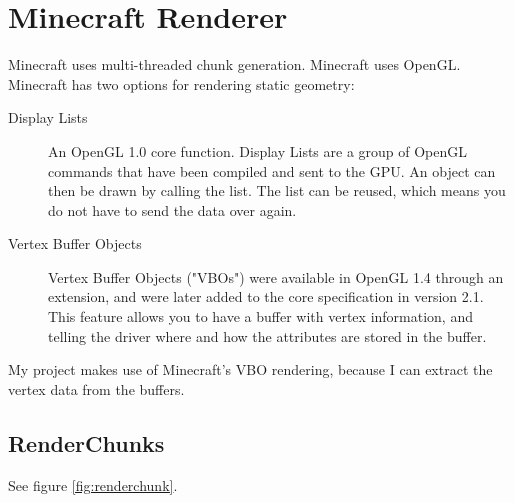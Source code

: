 \documentclass[]{article}
\begin{document}
\section{Minecraft Renderer}
Minecraft uses multi-threaded chunk generation.
Minecraft uses OpenGL.
Minecraft has two options for rendering static geometry:
\begin{description}
  \item[Display Lists] An OpenGL 1.0 core function.
    Display Lists are a group of OpenGL commands that have been compiled and sent to the GPU.
    An object can then be drawn by calling the list.
    The list can be reused, which means you do not have to send the data over again.
  \item[Vertex Buffer Objects] Vertex Buffer Objects ("VBOs") were available in OpenGL 1.4 through an extension, and were later added to the core specification in version 2.1.
    This feature allows you to have a buffer with vertex information, and telling the driver where and how the attributes are stored in the buffer.
\end{description}
My project makes use of Minecraft's VBO rendering, because I can extract the vertex data from the buffers.

\subsection{RenderChunks}
See figure \ref{fig:renderchunk}.
\end{document}
